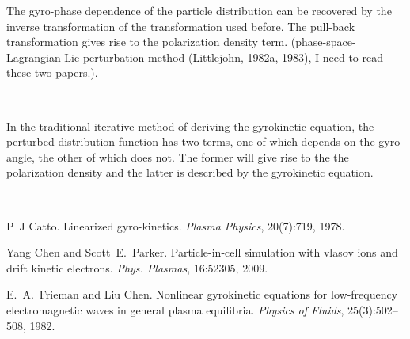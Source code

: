 \documentclass{article}
\newcommand{\tmtextit}[1]{{\itshape{#1}}}
\begin{document}
The gyro-phase dependence of the particle distribution can be recovered by
the inverse transformation of the transformation used before. The pull-back
transformation gives rise to the polarization density term.
(phase-space-Lagrangian Lie perturbation method (Littlejohn, 1982a, 1983), I
need to read these two papers.).

\

In the traditional iterative method of deriving the gyrokinetic equation, the
perturbed distribution function has two terms, one of which depends on the
gyro-angle, the other of which does not. The former will give rise to the the
polarization density and the latter is described by the gyrokinetic equation.

\

\begin{thebibliography}{1}
  P~J Catto.{\newblock} Linearized
  gyro-kinetics.{\newblock} \tmtextit{Plasma Physics}, 20(7):719,
  1978.{\newblock}
  
  Yang Chen  and  Scott~E.~Parker.{\newblock}
  Particle-in-cell simulation with vlasov ions and drift kinetic
  electrons.{\newblock} \tmtextit{Phys. Plasmas}, 16:52305, 2009.{\newblock}
  
  E.~A.~Frieman  and  Liu Chen.{\newblock} Nonlinear
  gyrokinetic equations for low‐frequency electromagnetic waves in general
  plasma equilibria.{\newblock} \tmtextit{Physics of Fluids}, 25(3):502--508,
  1982.{\newblock}
\end{thebibliography}
\end{document}
